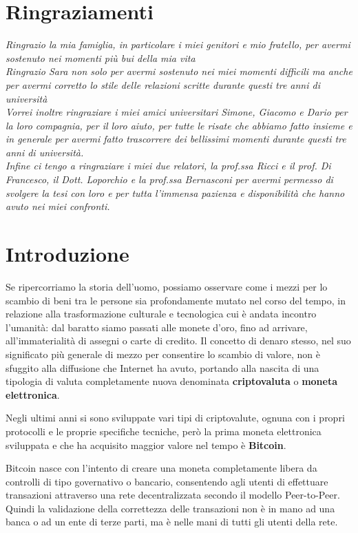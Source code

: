 \chapter*{Ringraziamenti} %
\begin{flushright}
\itshape 
Ringrazio la mia famiglia, in particolare i miei genitori e mio fratello, per avermi sostenuto nei momenti più bui della mia vita\\
Ringrazio Sara non solo per avermi sostenuto nei miei momenti difficili ma anche per avermi corretto lo stile delle relazioni scritte durante questi tre anni di università\\ 
Vorrei inoltre ringraziare i miei amici universitari Simone, Giacomo e Dario per la loro compagnia, per il loro aiuto, per tutte le risate che abbiamo fatto insieme e in generale per avermi fatto trascorrere dei bellissimi momenti durante questi tre anni di università.\\
Infine ci tengo a ringraziare i miei due relatori, la prof.ssa Ricci e il prof. Di Francesco, il Dott. Loporchio e la prof.ssa Bernasconi per avermi permesso di svolgere la tesi con loro e per tutta l'immensa pazienza e disponibilità che hanno avuto nei miei confronti.
\end{flushright}


\chapter{Introduzione}
Se ripercorriamo la storia dell'uomo, possiamo osservare come i mezzi per lo scambio di beni tra le persone sia profondamente mutato nel corso del tempo, in relazione alla trasformazione culturale e tecnologica cui è andata incontro l’umanità: dal baratto siamo passati alle monete d’oro, fino ad arrivare, all’immaterialità di assegni o carte di credito. Il concetto di denaro stesso, nel suo significato più generale di mezzo per consentire lo scambio di valore, non è sfuggito alla diffusione che Internet ha avuto, portando alla nascita di una tipologia di valuta completamente nuova denominata \textbf{criptovaluta} o \textbf{moneta elettronica}. 

Negli ultimi anni si sono sviluppate vari tipi di criptovalute, ognuna con i propri protocolli e le proprie specifiche tecniche, però la prima moneta elettronica sviluppata e che ha acquisito maggior valore nel tempo è \textbf{Bitcoin}. 

Bitcoin nasce con l'intento di creare una moneta completamente libera da controlli di tipo governativo o bancario, consentendo agli utenti di effettuare transazioni attraverso una rete decentralizzata secondo il modello Peer-to-Peer. Quindi la validazione della correttezza delle transazioni non è in mano ad una banca o ad un ente di terze parti, ma è nelle mani di tutti gli utenti della rete. 

